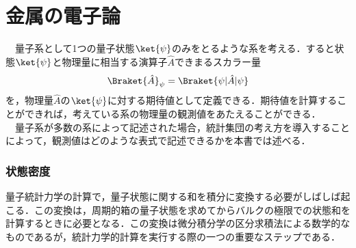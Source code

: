 \part{金属の電子論}
　量子系として1つの量子状態$\ket{\psi}$のみをとるような系を考える．すると状態$\ket{\psi}$と物理量に相当する演算子$\hat{A}$できまるスカラー量
\begin{align}
\label{ev}
\Braket{\hat{A}}_{\psi}=\Braket{\psi|\hat{A}|\psi}
\end{align}
を，物理量$\hat{A}$の$\ket{\psi}$に対する期待値として定義できる．期待値を計算することができれば，考えている系の物理量の観測値をあたえることができる．\\
　量子系が多数の系によって記述された場合，統計集団の考え方を導入することによって，観測値はどのような表式で記述できるかを本書では述べる．






\section{状態密度}
量子統計力学の計算で，量子状態に関する和を積分に変換する必要がしばしば起こる．この変換は，周期的箱の量子状態を求めてからバルクの極限での状態和を計算するときに必要となる．この変換は微分積分学の区分求積法による数学的なものであるが，統計力学的計算を実行する際の一つの重要なステップである．
